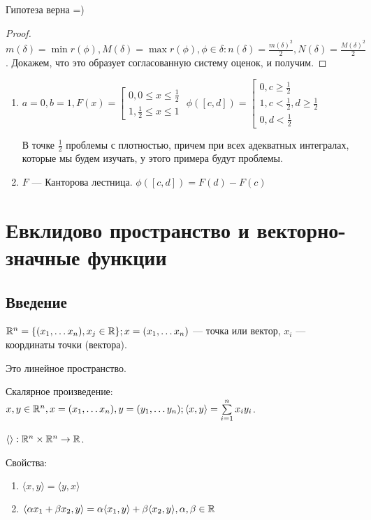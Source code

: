 \documentclass[12pt]{report}
\begin{document}
\begin{st}
Гипотеза верна =)
\end{st}
\begin{proof}
$m(\delta) = \min{r(\phi)}, M(\delta) = \max{r(\phi)}, \phi \in \delta: n(\delta) = \frac{m(\delta)^2}{2}, N(\delta) = \frac{M(\delta)^2}{2}$. Докажем, что это образует согласованную систему оценок, и получим.
\end{proof}

\begin{ex}
\begin{enumerate}
$\lessdot [a, b]; F:[a, b] \to \R$. Сделаем $\phi([c, d]) = F(d) - F(c)$.
\item $a = 0, b = 1, F(x) = \left[\begin{matrix}
0, 0 \le x \le \frac{1}{2}\\
1, \frac{1}{2} \le x \le 1
\end{matrix}\right.$ 
$\phi([c, d]) = \left[\begin{matrix}
0, c \ge \frac{1}{2}\\
1, c < \frac{1}{2}, d \ge \frac{1}{2}\\
0, d < \frac{1}{2}
\end{matrix}\right.
$

В точке $\frac{1}{2}$ проблемы с плотностью, причем при всех адекватных интегралах, которые мы будем изучать, у этого примера будут проблемы.

\item $F$ --- Канторова лестница. $\phi([c, d]) = F(d) - F(c)$
\end{enumerate}
\end{ex}

\chapter{Евклидово пространство и векторно-значные функции}

\section{Введение}

\begin{rem}
$\mathbb{R}^n = \{(x_1, \dots x_n), x_j \in \mathbb{R}\}; x = (x_1, \dots x_n)$ --- точка или вектор, $x_i$ --- координаты точки (вектора).

Это линейное пространство.
\end{rem}

\begin{defn}
Скалярное произведение: $x, y \in \mathbb{R}^n, x = (x_1, \dots x_n), y = (y_1, \dots y_n); \langle x, y \rangle = \sum\limits_{i = 1}^n{x_iy_i}$.

$\langle \rangle: \mathbb{R}^n \times \mathbb{R}^n \to \mathbb{R}$.

Свойства: 
\begin{enumerate}
\item $\langle x, y \rangle = \langle y, x \rangle$
\item $\langle \alpha x_1 + \beta x_2, y \rangle = \alpha \langle x_1, y \rangle + \beta \langle x_2, y \rangle, \alpha, \beta \in \mathbb{R}$
\end{enumerate}
\end{defn}
\end{document}
